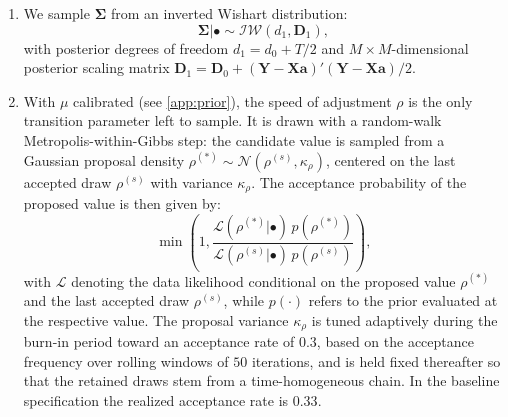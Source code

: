\begin{enumerate}
\begin{equation*}
    \begin{aligned}
        \tau_k|\bullet &\sim \mathcal{IG}\left(\frac{K + 1}{2}, \frac{1}{\phi_k} + \sum_{j = 1}^{K} \frac{a_{kj}}{2\lambda_{kj}}\right), \\
        \lambda_{kj}|\bullet &\sim \mathcal{IG}\left(1, \frac{1}{\zeta_{kj}}+ \frac{a_{kj}}{2 \tau_k}\right), \\
    \end{aligned} 
    \end{equation*}
    where the two auxiliary variables $\phi_k$ and $\zeta_{kj}$ are also drawn from inverted Gamma distributions: 
    \begin{equation*}
    \begin{aligned}
        \phi_k|\bullet &\sim \mathcal{IG}\left(1,1+\frac{1}{\tau_k} \right), \\
        \zeta_{kj}|\bullet &\sim \mathcal{IG}\left(1,1+\frac{1}{\lambda_{kj}} \right).
    \end{aligned} 
    \end{equation*}
    \item We sample $\bm \Sigma$ from an inverted Wishart distribution: 
    \begin{equation*}
        \bm \Sigma|\bullet \sim \mathcal{IW}(d_1, \bm D_1),
    \end{equation*} 
    with posterior degrees of freedom $d_1 = d_0 + T/2$ and $M \times M$-dimensional posterior scaling matrix $\bm D_1 = \bm D_0 + (\bm Y - \bm X \bm a)'(\bm Y - \bm X \bm a)/2 $.
    \item With $\mu$ calibrated (see \autoref{app:prior}), the speed of adjustment $\rho$ is the only transition parameter left to sample. It is drawn with a random-walk Metropolis-within-Gibbs step: the candidate value is sampled from a Gaussian proposal density $\rho^{(*)} \sim \mathcal{N}(\rho^{(s)},  \kappa_{\rho})$, centered on the last accepted draw $\rho^{(s)}$ with variance $\kappa_{\rho}$. The acceptance probability of the proposed value is then given by:
    \begin{equation*}
        \min \left(1, \frac{\mathcal{L}(\rho^{(*)}|\bullet)\, p(\rho^{(*)})}{\mathcal{L}(\rho^{(s)}|\bullet)\, p(\rho^{(s)})} \right),
    \end{equation*}
    with $\mathcal{L}$ denoting the data likelihood conditional on the proposed value $\rho^{(*)}$ and the last accepted draw $\rho^{(s)}$, while $p(\cdot)$ refers to the prior evaluated at the respective value. The proposal variance $\kappa_\rho$ is tuned adaptively during the burn-in period toward an acceptance rate of $0.3$, based on the acceptance frequency over rolling windows of $50$ iterations, and is held fixed thereafter so that the retained draws stem from a time-homogeneous chain. In the baseline specification the realized acceptance rate is $0.33$.

\end{enumerate}
